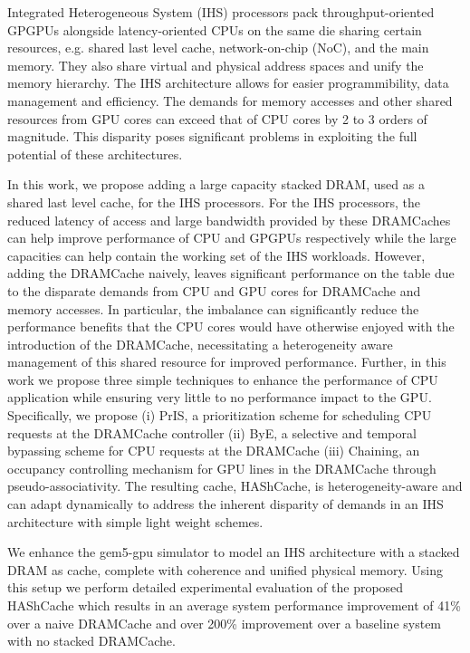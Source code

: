 \par Integrated Heterogeneous System (IHS) processors pack throughput-oriented GPGPUs alongside latency-oriented CPUs on the same die sharing certain resources, e.g. shared last level cache, network-on-chip (NoC), and the main memory. They also share virtual and physical address spaces and unify the memory hierarchy. The IHS architecture allows for easier programmibility, data management and efficiency. The demands for memory accesses and other shared resources from GPU cores can exceed that of CPU cores by 2 to 3 orders of magnitude. This disparity poses significant problems in exploiting the full potential of these architectures.
\par In this work, we propose adding a large capacity stacked DRAM, used as a shared last level cache, for the IHS processors. For the IHS processors, the reduced latency of access and large bandwidth provided by these DRAMCaches can help improve performance of CPU and GPGPUs respectively while the large capacities can help contain the working set of the IHS workloads. However, adding the DRAMCache naively, leaves significant performance on the table due to the disparate demands from CPU and GPU cores for DRAMCache and memory accesses. In particular, the imbalance can significantly reduce the performance benefits that the CPU cores would have otherwise enjoyed with the introduction of the DRAMCache, necessitating a heterogeneity aware management of this shared resource for improved performance. Further, in this work we propose three simple techniques to enhance the performance of CPU application while ensuring very little to no performance impact to the GPU. Specifically, we propose (i) PrIS, a prioritization scheme for scheduling CPU
requests at the DRAMCache controller (ii) ByE, a selective and temporal bypassing scheme for CPU requests at the DRAMCache (iii) Chaining, an occupancy controlling mechanism for GPU lines in the DRAMCache through pseudo-associativity. The resulting cache, HAShCache, is heterogeneity-aware and can adapt dynamically to address the inherent disparity of demands in an IHS architecture with simple light weight schemes. 
\par We enhance the gem5-gpu simulator to model an IHS architecture with a stacked DRAM as cache, complete with coherence and unified physical memory. Using this setup we perform detailed experimental evaluation of the proposed HAShCache which results in an average system performance improvement of 41\% over a naive DRAMCache and over 200\% improvement over a baseline system with no stacked DRAMCache.
